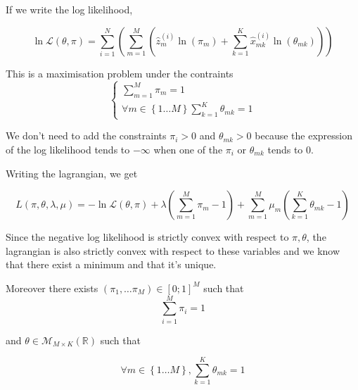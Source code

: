 \documentclass[a4paper, 11pt]{article}
\newcommand{\intn}[2]{\left\{ #1 \dots #2 \right\}}
\newcommand{\intr}[2]{\left[ #1 ; #2 \right]}
\newcommand{\logn}[1]{\ln\left( #1\right)}
\begin{document}
If we write the log likelihood,

\begin{equation*}
  \ln{\mathcal{L}(\theta, \pi)} = \sum_{i = 1}^{N} \left( \sum_{m = 1}^M \left( \hat{z}^{(i)}_m \logn{\pi_m} + \sum_{k = 1}^K \hat{x}^{(i)}_{m k} \logn{\theta_{m k}} \right) \right)
\end{equation*}

This is a maximisation problem under the contraints
\begin{equation*}
  \left\{
  \begin{array}{l}
    \sum_{m = 1}^M \pi_m = 1 \\
    \forall m \in \intn{1}{M} \sum_{k = 1}^{K} \theta_{m k} = 1
  \end{array}
  \right.
\end{equation*}

We don't need to add the constraints $\pi_i > 0$ and $\theta_{m k} > 0$
because the expression of the log likelihood tends to $-\infty$
when one of the $\pi_i$ or $\theta_{m k}$ tends to $0$.

Writing the lagrangian, we get

\begin{equation*}
  L(\pi,\theta, \lambda, \mu) = - \ln{\mathcal{L}(\theta, \pi)} + \lambda \left( \sum_{m = 1}^M {\pi_m} - 1\right) + \sum_{m = 1}^M \mu_m \left( \sum_{k = 1}^K \theta_{m k}  - 1\right)
\end{equation*}


Since the negative log likelihood is strictly convex with respect to
$\pi, \theta$, the lagrangian is also strictly convex with respect
to these variables and we know that there exist a minimum and that
it's unique.

Moreover there exists $(\pi_1, \dots \pi_M) \in \intr{0}{1}^M$ such that
\begin{equation*}
  \sum_{i = 1}^M \pi_i = 1
\end{equation*}

and $\theta \in \mathcal{M}_{M \times K}(\mathbb{R})$ such that

\begin{equation*}
  \forall m \in \intn{1}{M}, \sum_{k = 1}^K \theta_{m k} = 1
\end{equation*}
\end{document}
